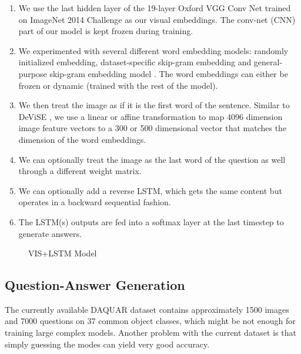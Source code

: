 \documentclass{article} %
\renewcommand{\#}[1]{\textbf{#1}}
\begin{document}
\begin{enumerate}

\item We use the last hidden layer of the 19-layer Oxford VGG Conv Net
\cite{simonyan14} trained on ImageNet 2014 Challenge \cite{ilsvrc14} as our
visual embeddings. The conv-net (CNN) part of our model is kept frozen during
training.

\item We experimented with several different word embedding models: randomly
initialized embedding, dataset-specific skip-gram embedding and general-purpose
skip-gram embedding model \cite{mikolov13}. The word embeddings can either be
frozen or dynamic (trained with the rest of the model).

\item We then treat the image as if it is the first word of the sentence.
Similar to DeViSE \cite{frome13}, we use a linear or affine transformation to
map 4096 dimension image feature vectors to a 300 or 500 dimensional vector
that matches the dimension of the word embeddings.

\item We can optionally treat the image as the last word of the question as
well through a different weight matrix.

\item We can optionally add a reverse LSTM, which gets the same content but
operates in a backward sequential fashion.

\item The LSTM(s) outputs are fed into a softmax layer at the last timestep to
generate answers.

\end{enumerate}

\begin{figure}
\centering
\scalebox{0.6}{
}
\caption{VIS+LSTM Model}
\label{fig:imgword}
\end{figure}

\subsection{Question-Answer Generation}

The currently available DAQUAR dataset contains approximately 1500 images and
7000 questions on 37 common object classes, which might be not enough for
training large complex models. Another problem with the current dataset is that
simply guessing the modes can yield very good accuracy.
\end{document}
